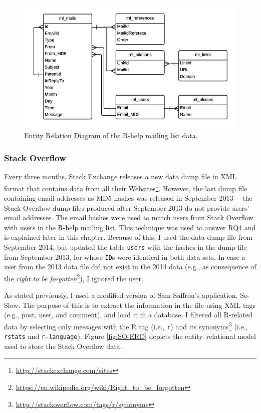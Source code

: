 \documentclass{sig-alternate-05-2015}
\begin{document}
	\begin{figure} [!ht]
		\centering
		\includegraphics[width=\columnwidth]{Figures/ML-ERD}
		\caption{Entity Relation Diagram of the R-help mailing list data.}
		\label{fig:ML-ERD}
	\end{figure}

\subsubsection*{Stack Overflow}
	Every three months, Stack Exchange releases a new data dump file in XML format that contains data from all their Websites\footnote{\url{http://stackexchange.com/sites}}.
	However, the last dump file containing email addresses as MD5 hashes was released in September 2013--- 
	the Stack Overflow dump files produced after September 2013 do not provide users' email addresses.
	The email hashes were used to match users from Stack Overflow with users in the R-help mailing list. 
	This technique was used to answer RQ4 and is explained later in this chapter.
	Because of this, I used the data dump file from September 2014, but updated the table \texttt{users} with the hashes in the dump file from September 2013, for whose \texttt{ID}s were identical in both data sets.
	In case a user from the 2013 data file did not exist in the 2014 data (e.g., as consequence of the \textit{right to be forgotten}\footnote{\url{https://en.wikipedia.org/wiki/Right\_to\_be\_forgotten}}), I ignored the user.

	As stated previously, I used a modified version of Sam Saffron's application, So-Slow.
	The purpose of this is to extract the information in the file using XML tags (e.g., post, user, and comment), and load it in a database.
	I filtered all R-related data by selecting only messages with the R tag (i.e., \texttt{r}) and its synonyms\footnote{\url{http://stackoverflow.com/tags/r/synonyms}} (i.e., \texttt{rstats} and \texttt{r-language}).
	Figure \ref{fig:SO-ERD} depicts the entity--relational model used to store the Stack Overflow data.
\end{document}
